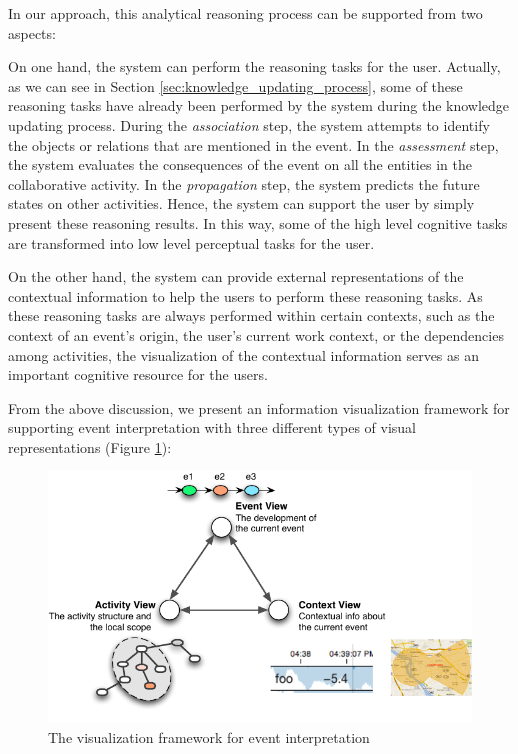 In our approach, this analytical reasoning process can be supported from two aspects:

On one hand, the system can perform the reasoning tasks for the user. Actually, as we can see in Section \ref{sec:knowledge_updating_process}, some of these reasoning tasks have already been performed by the system during the knowledge updating process. During the \emph{association} step, the system attempts to identify the objects or relations that are mentioned in the event. In the \emph{assessment} step, the system evaluates the consequences of the event on all the entities in the collaborative activity. In the \emph{propagation} step, the system predicts the future states on other activities. Hence, the system can support the user by simply present these reasoning results. In this way, some of the high level cognitive tasks are transformed into low level perceptual tasks for the user.

On the other hand, the system can provide external representations of the contextual information to help the users to perform these reasoning tasks. As these reasoning tasks are always performed within certain contexts, such as the context of an event's origin, the user's current work context, or the dependencies among activities, the visualization of the contextual information serves as an important cognitive resource for the users.

From the above discussion, we present an information visualization framework for supporting event interpretation with three different types of visual representations (Figure \ref{fig:event_interpretation}):

\begin{figure}[htbp] %
	\centering
	\includegraphics{event_interpretation.pdf} 
	\caption{The visualization framework for event interpretation}
	\label{fig:event_interpretation}
\end{figure}

